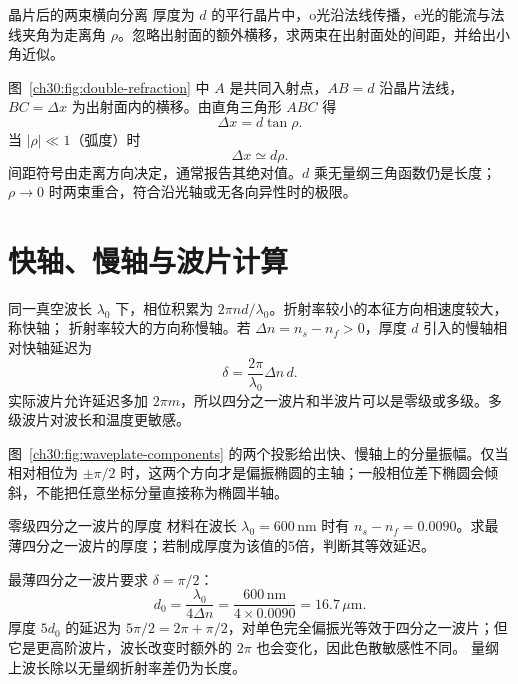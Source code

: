\begin{origexamplebox}{晶片后的两束横向分离}
厚度为 $d$ 的平行晶片中，o光沿法线传播，e光的能流与法线夹角为走离角 $\rho$。忽略出射面的额外横移，求两束在出射面处的间距，并给出小角近似。
\end{origexamplebox}
\begin{xesolution}
图~\ref{ch30:fig:double-refraction} 中 $A$ 是共同入射点，$AB=d$ 沿晶片法线，$BC=\Delta x$ 为出射面内的横移。由直角三角形 $ABC$ 得
\[
 \boxed{\Delta x=d\tan\rho}.
\]
当 $|\rho|\ll1$（弧度）时
\[
 \boxed{\Delta x\simeq d\rho}.
\]
间距符号由走离方向决定，通常报告其绝对值。$d$ 乘无量纲三角函数仍是长度；$\rho\to0$ 时两束重合，符合沿光轴或无各向异性时的极限。
\end{xesolution}

\section{快轴、慢轴与波片计算}

同一真空波长 $\lambda_0$ 下，相位积累为 $2\pi nd/\lambda_0$。折射率较小的本征方向相速度较大，称快轴；
折射率较大的方向称慢轴。若 $\Delta n=n_s-n_f>0$，厚度 $d$ 引入的慢轴相对快轴延迟为
\begin{equation}
 \delta=\frac{2\pi}{\lambda_0}\Delta n\,d.
\end{equation}
实际波片允许延迟多加 $2\pi m$，所以四分之一波片和半波片可以是零级或多级。多级波片对波长和温度更敏感。

\begin{center}
\label{ch30:fig:waveplate-components}
\end{center}
图~\ref{ch30:fig:waveplate-components} 的两个投影给出快、慢轴上的分量振幅。仅当相对相位为 $\pm\pi/2$ 时，这两个方向才是偏振椭圆的主轴；一般相位差下椭圆会倾斜，不能把任意坐标分量直接称为椭圆半轴。

\begin{origexamplebox}{零级四分之一波片的厚度}
材料在波长 $\lambda_0=600\,\mathrm{nm}$ 时有 $n_s-n_f=0.0090$。求最薄四分之一波片的厚度；若制成厚度为该值的5倍，判断其等效延迟。
\end{origexamplebox}
\begin{xesolution}
最薄四分之一波片要求 $\delta=\pi/2$：
\[
 d_0=\frac{\lambda_0}{4\Delta n}
 =\frac{600\,\mathrm{nm}}{4\times0.0090}
 =\boxed{16.7\,\mu\mathrm m}.
\]
厚度 $5d_0$ 的延迟为 $5\pi/2=2\pi+\pi/2$，对单色完全偏振光等效于四分之一波片；但它是更高阶波片，波长改变时额外的 $2\pi$ 也会变化，因此色散敏感性不同。
量纲上波长除以无量纲折射率差仍为长度。
\end{xesolution}


